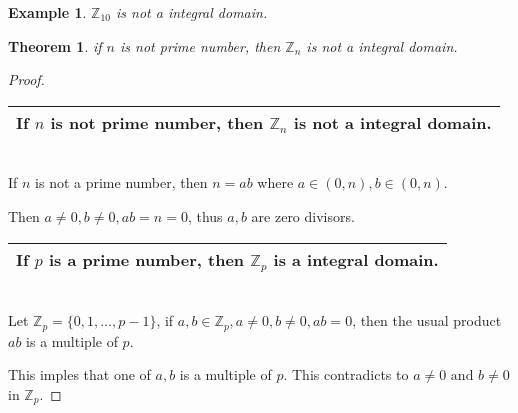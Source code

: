 \documentclass{article}
\theoremstyle{MyNonumberplain}
\theoremstyle{break}
\newtheorem*{proof}{Proof. }
\newcommand{\infixand}{\text{ and }}
\theoremstyle{break}
\newtheorem{theorem}{Theorem}[section]
\newtheorem{example}{Example}[section]
\theoremstyle{break}
\theoremstyle{definition}
\theoremstyle{break}
\begin{document}
\begin{expbox}
    \begin{example}
        $\mathbb{Z}_{10}$ is not a integral domain.
    \end{example}
\end{expbox}

\begin{thmbox}
    \begin{theorem}
        if $n$ is not prime number, then $\mathbb{Z}_n$ is not a integral domain.
    \end{theorem}
    \begin{prfbox}
        \begin{proof}
            \begin{tabular}{|c|}
                \hline
                If $n$ is not prime number, then $\mathbb{Z}_n$ is not a integral domain.\\
                \hline
              \end{tabular}\\
              
              If $n$ is not a prime number, then $n = a b$ where $a \in (0, n), b \in (0,
              n)$.\bigskip
              
              Then $a \neq 0, b \neq 0, a b = n = 0$, thus $a, b$ are zero divisors.\bigskip
              
              \begin{tabular}{|c|}
                \hline
                If $p$ is a prime number, then $\mathbb{Z}_p$ is a integral domain.\\
                \hline
              \end{tabular}\\
              
              Let $\mathbb{Z}_p = \{ 0, 1, \ldots, p - 1 \}$, if $a, b \in \mathbb{Z}_p, a
              \neq 0, b \neq 0, a b = 0$, then the usual product $a b$ is a multiple of $p$.\bigskip
              
              This imples that one of $a, b$ is a multiple of $p$. This contradicts to $a
              \neq 0 \infixand b \neq 0$ in $\mathbb{Z}_p$.
        \end{proof}
    \end{prfbox}
\end{thmbox}
\end{document}

